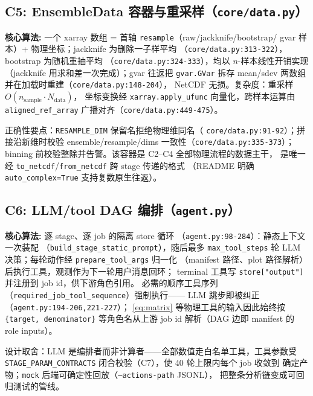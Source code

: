 \documentclass[UTF8]{ctexart}
\begin{document}
\subsection{C5: EnsembleData 容器与重采样（\texttt{core/data.py}）}

\begin{algobox}
\textbf{核心算法:} 一个 xarray 数组 = 首轴 \texttt{resample}（raw/jackknife/bootstrap/
gvar 样本）+ 物理坐标；jackknife 为删除一子样平均
（\texttt{\nolinkurl{core/data.py:313-322}}），bootstrap 为随机重抽平均
（\texttt{\nolinkurl{core/data.py:324-333}}），均以 $n$-样本线性开销实现
（jackknife 用求和差一次完成）；gvar 往返把 \texttt{gvar.GVar} 拆存
mean/sdev 两数组并在加载时重建（\texttt{\nolinkurl{core/data.py:148-204}}），
NetCDF 无损。复杂度：重采样 $O(n_{\mathrm{sample}}\cdot N_{\mathrm{data}})$，
坐标变换经 \texttt{xarray.apply\_ufunc} 向量化，跨样本运算由
\texttt{aligned\_ref\_array} 广播对齐（\texttt{\nolinkurl{core/data.py:449-475}}）。
\end{algobox}
正确性要点：\texttt{RESAMPLE\_DIM} 保留名拒绝物理维同名（
\texttt{\nolinkurl{core/data.py:91-92}}）；拼接沿新维时校验
ensemble/resample/dims 一致性（\texttt{\nolinkurl{core/data.py:335-373}}）；
binning 前校验整除并告警。该容器是 C2--C4 全部物理流程的数据主干，
是唯一经 \texttt{to\_netcdf}/\texttt{from\_netcdf} 跨 stage 传递的格式
（README 明确 \texttt{auto\_complex=True} 支持复数原生往返）。

\subsection{C6: LLM/tool DAG 编排（\texttt{agent.py}）}

\begin{algobox}
\textbf{核心算法:} 逐 stage、逐 job 的隔离 store 循环
（\texttt{\nolinkurl{agent.py:98-284}}）：静态上下文一次装配
（\texttt{build\_stage\_static\_prompt}），随后最多 \texttt{max\_tool\_steps}
轮 LLM 决策；每轮动作经 \texttt{prepare\_tool\_args} 归一化
（manifest 路径、plot 路径解析）后执行工具，观测作为下一轮用户消息回环；
terminal 工具写 \texttt{store["output"]} 并注册到 job id，供下游角色引用。
必需的顺序工具序列（\texttt{required\_job\_tool\_sequence}）强制执行——
LLM 跳步即被纠正（\texttt{\nolinkurl{agent.py:194-206,221-227}}）；
\eqref{eq:matrix} 等物理工具的输入因此始终按 \texttt{\{target, denominator\}}
等角色名从上游 job id 解析（DAG 边即 manifest 的 role inputs）。
\end{algobox}
设计取舍：LLM 是编排者而非计算者——全部数值走白名单工具，工具参数受
\texttt{\nolinkurl{STAGE_PARAM_CONTRACTS}} 闭合校验（C7），使 40 轮上限内每个 job 收敛到
确定产物；\texttt{mock} 后端可确定性回放（\texttt{--actions-path} JSONL），
把整条分析链变成可回归测试的管线。
\end{document}

